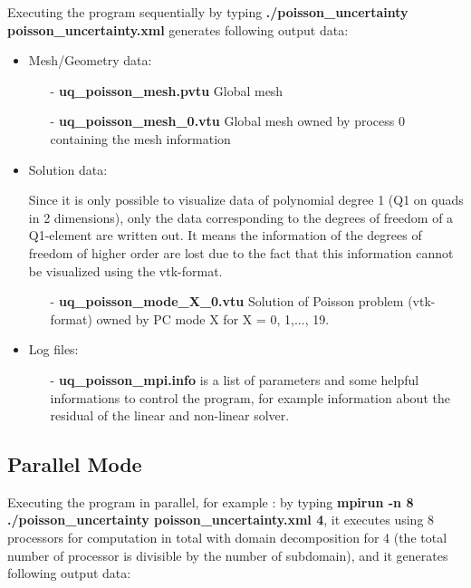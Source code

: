 \documentclass{article}
\begin{document}
Executing the program sequentially by typing \textbf{./poisson\_uncertainty poisson\_uncertainty.xml} generates following output data:

\begin{itemize}
 \item Mesh/Geometry data:
\begin{itemize}
      \item[-] \textbf{uq\_poisson\_mesh.pvtu} Global mesh
      \item[-] \textbf{uq\_poisson\_mesh\_0.vtu} Global mesh owned by process 0 containing the mesh information
\end{itemize}
\item[]
\item Solution data:

\item[]Since it is only possible to visualize data of polynomial degree 1 (Q1 on quads
in 2 dimensions), only the data corresponding to the degrees of freedom of a Q1-element
are written out. It means the information of the degrees of freedom of higher order are lost
due to the fact that this information cannot be visualized using the vtk-format.

\begin{itemize}
      \item[-] \textbf{uq\_poisson\_mode\_X\_0.vtu} Solution of Poisson problem (vtk-format) owned by PC mode X for X = 0, 1,..., 19.
\end{itemize}

\item Log files:
\begin{itemize}
      \item[-] \textbf{uq\_poisson\_mpi.info} is a list of parameters and some helpful informations to control
the program, for example information about the residual of the linear and non-linear solver.
\end{itemize}

\end{itemize}

\subsection{Parallel Mode}

Executing the program in parallel, for example : by typing \textbf{mpirun -n 8 ./poisson\_uncertainty poisson\_uncertainty.xml 4}, it executes using 8 processors for computation in total with domain decomposition for 4 (the total number of processor is divisible by the number of subdomain), and it generates following output data:
\end{document}
